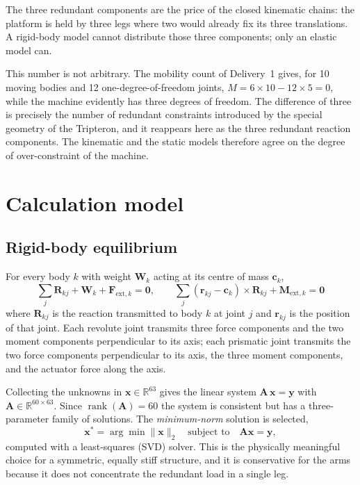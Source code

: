\documentclass[11pt]{article}
\begin{document}
The three redundant components are the price of the closed kinematic chains: the
platform is held by three legs where two would already fix its three translations. A
rigid-body model cannot distribute those three components; only an elastic model can.

This number is not arbitrary. The mobility count of Delivery~1 gives, for 10 moving
bodies and 12 one-degree-of-freedom joints,
$M=6\times10-12\times5=0$, while the machine evidently has three degrees of freedom.
The difference of three is precisely the number of redundant constraints introduced by
the special geometry of the Tripteron, and it reappears here as the three redundant
reaction components. The kinematic and the static models therefore agree on the degree of
over-constraint of the machine.

\section{Calculation model}\label{sec:sta-model}

\subsection{Rigid-body equilibrium}

For every body $k$ with weight $\bm W_k$ acting at its centre of mass $\bm c_k$,
\begin{equation}
\sum_j \bm R_{kj} + \bm W_k + \bm F_{\text{ext},k} = \bm 0,
\qquad
\sum_j (\bm r_{kj}-\bm c_k)\times\bm R_{kj} + \bm M_{\text{ext},k} = \bm 0
\end{equation}
where $\bm R_{kj}$ is the reaction transmitted to body $k$ at joint $j$ and
$\bm r_{kj}$ is the position of that joint. Each revolute joint transmits three force
components and the two moment components perpendicular to its axis; each prismatic joint
transmits the two force components perpendicular to its axis, the three moment components,
and the actuator force along the axis.

Collecting the unknowns in $\bm x\in\mathbb R^{63}$ gives the linear system
$\bm A\,\bm x=\bm y$ with $\bm A\in\mathbb R^{60\times63}$. Since
$\operatorname{rank}(\bm A)=60$ the system is consistent but has a three-parameter family
of solutions. The \emph{minimum-norm} solution is selected,
\begin{equation}
\bm x^{\ast}=\arg\min\lVert\bm x\rVert_2 \quad\text{subject to}\quad \bm A\bm x=\bm y,
\end{equation}
computed with a least-squares (SVD) solver. This is the physically meaningful choice for a
symmetric, equally stiff structure, and it is conservative for the arms because it does
not concentrate the redundant load in a single leg.
\end{document}
